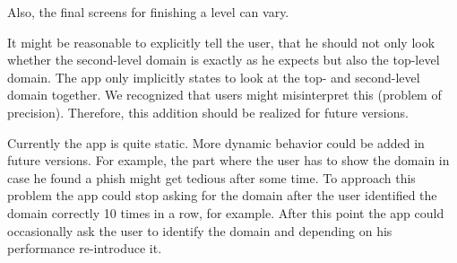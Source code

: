 \begin{description}[leftmargin=0cm]
	Also, the final screens for finishing a level can vary.
	\item[Top-Level Domain Attacks:] It might be reasonable to explicitly tell the user, that he should not only look whether the second-level domain is exactly as he expects but also the top-level domain. The app only implicitly states to look at the top- and second-level domain together.
We recognized that users might misinterpret this (problem of precision).
Therefore, this addition should be realized for future versions.
	\item[Performance Dependent App Behavior:] Currently the app is quite static.
More dynamic behavior could be added in future versions.
For example, the part where the user has to show the domain in case he found a phish might get tedious after some time.
To approach this problem the app could stop asking for the domain after the user identified the domain correctly 10 times in a row, for example.
After this point the app could occasionally ask the user to identify the domain and depending on his performance re-introduce it.
\end{description}

 

